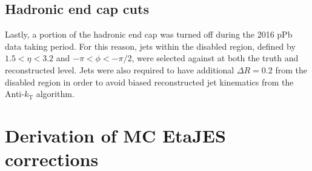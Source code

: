 \documentclass[NOTE, atlasdraft=true, texlive=2016, USenglish]{\ATLASLATEXPATH atlasdoc}
\begin{document}
\subsection{Hadronic end cap cuts}
Lastly, a portion of the hadronic end cap was turned off during the 2016 pPb data taking period. For this reason, jets within the disabled region, defined by $1.5<\eta<3.2$ and $-\pi<\phi<-\pi/2$, were selected against at both the truth and reconstructed level. Jets were also required to have additional $\Delta R=0.2$ from the disabled region in order to avoid biased reconstructed jet kinematics from the Anti-$k_{\text{T}}$ algorithm.

%


\section{Derivation of MC EtaJES corrections}
\label{sec:EtaJES}
\end{document}
